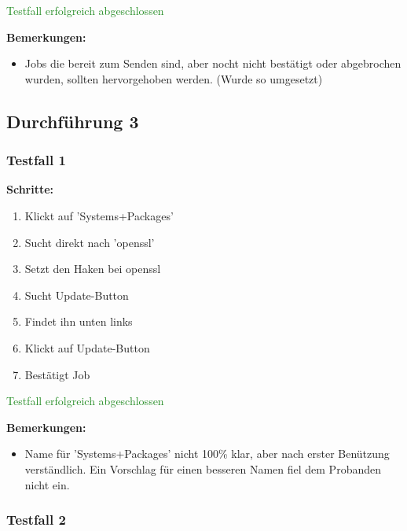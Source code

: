 \textcolor{ForestGreen}{Testfall erfolgreich abgeschlossen}

\bigskip
\textbf{Bemerkungen:}

\begin{itemize}[noitemsep,nolistsep]
    \item Jobs die bereit zum Senden sind, aber nocht nicht bestätigt oder abgebrochen wurden, sollten hervorgehoben werden. (Wurde so umgesetzt)
\end{itemize}



\subsection*{Durchführung 3}



\subsubsection*{Testfall 1}

\textbf{Schritte:}

\begin{enumerate}
    \item Klickt auf 'Systems+Packages'
    \item Sucht direkt nach 'openssl'
    \item Setzt den Haken bei openssl
    \item Sucht Update-Button
    \item Findet ihn unten links
    \item Klickt auf Update-Button
    \item Bestätigt Job
\end{enumerate}

\textcolor{ForestGreen}{Testfall erfolgreich abgeschlossen}

\bigskip
\textbf{Bemerkungen:}

\begin{itemize}[noitemsep,nolistsep]
    \item Name für 'Systems+Packages' nicht 100\% klar, aber nach erster Benützung verständlich. Ein Vorschlag für einen besseren Namen fiel dem Probanden nicht ein.
\end{itemize}


\subsubsection*{Testfall 2}


